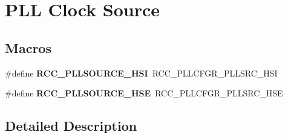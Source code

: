 \hypertarget{group___r_c_c___p_l_l___clock___source}{}\section{P\+LL Clock Source}
\label{group___r_c_c___p_l_l___clock___source}
\subsection*{Macros}
\begin{DoxyCompactItemize}
\item 
\mbox{\label{group___r_c_c___p_l_l___clock___source_ga0e07703f1ccb3d60f8a47a2dc631c218}} 
\#define {\bfseries R\+C\+C\+\_\+\+P\+L\+L\+S\+O\+U\+R\+C\+E\+\_\+\+H\+SI}~R\+C\+C\+\_\+\+P\+L\+L\+C\+F\+G\+R\+\_\+\+P\+L\+L\+S\+R\+C\+\_\+\+H\+SI
\item 
\mbox{\label{group___r_c_c___p_l_l___clock___source_ga197cea7fe5c2db26fe7fcdb0f99dd4d7}} 
\#define {\bfseries R\+C\+C\+\_\+\+P\+L\+L\+S\+O\+U\+R\+C\+E\+\_\+\+H\+SE}~R\+C\+C\+\_\+\+P\+L\+L\+C\+F\+G\+R\+\_\+\+P\+L\+L\+S\+R\+C\+\_\+\+H\+SE
\end{DoxyCompactItemize}


\subsection{Detailed Description}
